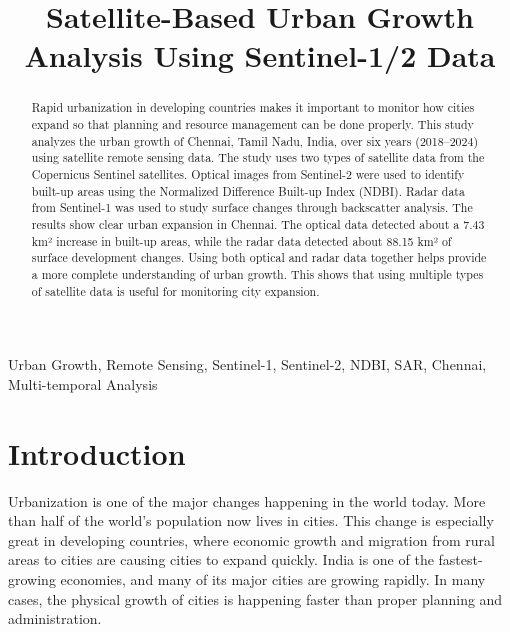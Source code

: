 \documentclass[conference]{IEEEtran}
\begin{document}
\title{Satellite-Based Urban Growth Analysis Using Sentinel-1/2 Data}

\author{
\and
{}
\and
{}
\and
{}
\and
{}
}

\maketitle

\begin{abstract}
Rapid urbanization in developing countries makes it important to monitor how cities expand so that planning and resource management can be done properly. This study analyzes the urban growth of Chennai, Tamil Nadu, India, over six years (2018–2024) using satellite remote sensing data. The study uses two types of satellite data from the Copernicus Sentinel satellites. Optical images from Sentinel-2 were used to identify built-up areas using the Normalized Difference Built-up Index (NDBI). Radar data from Sentinel-1 was used to study surface changes through backscatter analysis. The results show clear urban expansion in Chennai. The optical data detected about a 7.43 km² increase in built-up areas, while the radar data detected about 88.15 km² of surface development changes. Using both optical and radar data together helps provide a more complete understanding of urban growth. This shows that using multiple types of satellite data is useful for monitoring city expansion.

\end{abstract}

\begin{IEEEkeywords}
Urban Growth, Remote Sensing, Sentinel-1, Sentinel-2, NDBI, SAR, Chennai, Multi-temporal Analysis
\end{IEEEkeywords}

\section{Introduction}

Urbanization is one of the major changes happening in the world today. More than half of the world’s population now lives in cities. This change is especially great in developing countries, where economic growth and migration from rural areas to cities are causing cities to expand quickly. India is one of the fastest-growing economies, and many of its major cities are growing rapidly. In many cases, the physical growth of cities is happening faster than proper planning and administration.
\end{document}
